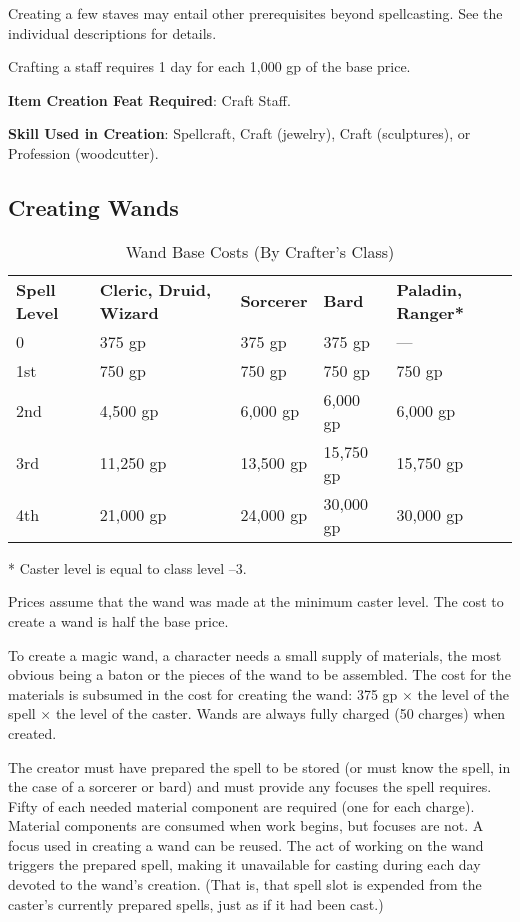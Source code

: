 Creating a few staves may entail other prerequisites beyond spellcasting. See the individual descriptions for details.
				
Crafting a staff requires 1 day for each 1,000 gp of the base price.
				
\textbf{Item Creation Feat Required}: Craft Staff.
				
\textbf{Skill Used in Creation}: Spellcraft, Craft (jewelry), Craft (sculptures), or Profession (woodcutter).
				
\subsection{Creating Wands}

\begin{table}[]
\sffamily
\caption{Wand Base Costs (By Crafter's Class)}
\begin{tabular}{lllll}
\textbf{Spell Level} & \textbf{Cleric, Druid, Wizard} & \textbf{Sorcerer} & \textbf{Bard} & \textbf{Paladin, Ranger*} \\
0                    & 375 gp                         & 375 gp            & 375 gp        & —                         \\
1st                  & 750 gp                         & 750 gp            & 750 gp        & 750 gp                    \\
2nd                  & 4,500 gp                       & 6,000 gp          & 6,000 gp      & 6,000 gp                  \\
3rd                  & 11,250 gp                      & 13,500 gp         & 15,750 gp     & 15,750 gp                 \\
4th                  & 21,000 gp                      & 24,000 gp         & 30,000 gp     & 30,000 gp                
\end{tabular}
* Caster level is equal to class level --3.
\end{table}
Prices assume that the wand was made at the minimum caster level. The cost to create a wand is half the base price.
				
To create a magic wand, a character needs a small supply of materials, the most obvious being a baton or the pieces of the wand to be assembled. The cost for the materials is subsumed in the cost for creating the wand: 375 gp \mbox{$\times$} the level of the spell \mbox{$\times$} the level of the caster. Wands are always fully charged (50 charges) when created.
				
The creator must have prepared the spell to be stored (or must know the spell, in the case of a sorcerer or bard) and must provide any focuses the spell requires. Fifty of each needed material component are required (one for each charge). Material components are consumed when work begins, but focuses are not. A focus used in creating a wand can be reused. The act of working on the wand triggers the prepared spell, making it unavailable for casting during each day devoted to the wand's creation. (That is, that spell slot is expended from the caster's currently prepared spells, just as if it had been cast.)
				
